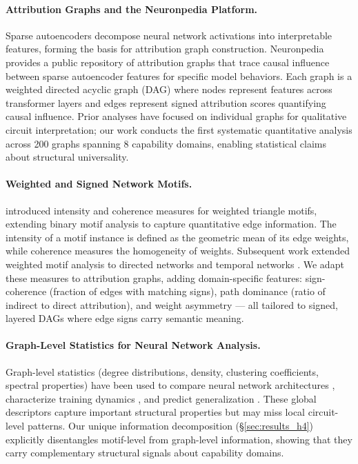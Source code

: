 \paragraph{Attribution Graphs and the Neuronpedia Platform.}
Sparse autoencoders \cite{bricken2023monosemanticity, cunningham2023sparse} decompose neural network activations into interpretable features, forming the basis for attribution graph construction. Neuronpedia \cite{neuronpedia2024} provides a public repository of attribution graphs that trace causal influence between sparse autoencoder features for specific model behaviors. Each graph is a weighted directed acyclic graph (DAG) where nodes represent features across transformer layers and edges represent signed attribution scores quantifying causal influence. Prior analyses have focused on individual graphs for qualitative circuit interpretation; our work conducts the first systematic quantitative analysis across 200 graphs spanning 8 capability domains, enabling statistical claims about structural universality.

\paragraph{Weighted and Signed Network Motifs.}
\citet{onnela2005intensity} introduced intensity and coherence measures for weighted triangle motifs, extending binary motif analysis to capture quantitative edge information. The intensity of a motif instance is defined as the geometric mean of its edge weights, while coherence measures the homogeneity of weights. Subsequent work extended weighted motif analysis to directed networks \cite{fagiolo2007clustering} and temporal networks \cite{paranjape2017motifs}. We adapt these measures to attribution graphs, adding domain-specific features: sign-coherence (fraction of edges with matching signs), path dominance (ratio of indirect to direct attribution), and weight asymmetry --- all tailored to signed, layered DAGs where edge signs carry semantic meaning.

\paragraph{Graph-Level Statistics for Neural Network Analysis.}
Graph-level statistics (degree distributions, density, clustering coefficients, spectral properties) have been used to compare neural network architectures \cite{you2020design}, characterize training dynamics \cite{frankle2019lottery}, and predict generalization \cite{jiang2019fantastic}. These global descriptors capture important structural properties but may miss local circuit-level patterns. Our unique information decomposition (\S\ref{sec:results_h4}) explicitly disentangles motif-level from graph-level information, showing that they carry complementary structural signals about capability domains.

